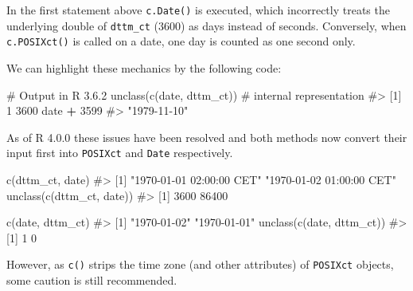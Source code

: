 \documentclass[
]{krantz}
\makeatletter
\newenvironment{Shaded}{\begin{snugshade}}{\end{snugshade}}
\newcommand{\CommentTok}[1]{\textcolor[rgb]{0.56,0.35,0.01}{\textit{#1}}}
\newcommand{\DataTypeTok}[1]{\textcolor[rgb]{0.13,0.29,0.53}{#1}}
\newcommand{\DecValTok}[1]{\textcolor[rgb]{0.00,0.00,0.81}{#1}}
\newcommand{\KeywordTok}[1]{\textcolor[rgb]{0.13,0.29,0.53}{\textbf{#1}}}
\newcommand{\NormalTok}[1]{#1}
\newcommand{\OperatorTok}[1]{\textcolor[rgb]{0.81,0.36,0.00}{\textbf{#1}}}
\newcommand{\StringTok}[1]{\textcolor[rgb]{0.31,0.60,0.02}{#1}}
\newenvironment{kframe}{%
\medskip{}
\setlength{\fboxsep}{.8em}
 \def\at@end@of@kframe{}%
 \ifinner\ifhmode%
  \def\at@end@of@kframe{\end{minipage}}%
  \begin{minipage}{\columnwidth}%
 \fi\fi%
 \def\FrameCommand##1{\hskip\@totalleftmargin \hskip-\fboxsep
 \colorbox{shadecolor}{##1}\hskip-\fboxsep
     \hskip-\linewidth \hskip-\@totalleftmargin \hskip\columnwidth}%
 \MakeFramed {\advance\hsize-\width
   \@totalleftmargin\z@ \linewidth\hsize
   \@setminipage}}%
 {\par\unskip\endMakeFramed%
 \at@end@of@kframe}
\renewenvironment{Shaded}{\begin{kframe}}{\end{kframe}}
\renewcommand{\KeywordTok} [1]{\textcolor[rgb]{0.00,0.44,0.13}{{#1}}}
\renewcommand{\DataTypeTok}[1]{\textcolor[rgb]{0.56,0.13,0.00}{{#1}}}
\renewcommand{\DecValTok}  [1]{\textcolor[rgb]{0.25,0.63,0.44}{{#1}}}
\renewcommand{\StringTok}  [1]{\textcolor[rgb]{0.25,0.44,0.63}{{#1}}}
\renewcommand{\CommentTok} [1]{\textcolor[rgb]{0.38,0.63,0.69}{{#1}}}
\renewcommand{\NormalTok}  [1]{{#1}}
\makeatother
\begin{document}
In the first statement above \texttt{c.Date()} is executed, which incorrectly treats the underlying double of \texttt{dttm\_ct} (3600) as days instead of seconds. Conversely, when \texttt{c.POSIXct()} is called on a date, one day is counted as one second only.

We can highlight these mechanics by the following code:

\begin{Shaded}
\begin{Highlighting}[]
\CommentTok{# Output in R 3.6.2}
\KeywordTok{unclass}\NormalTok{(}\KeywordTok{c}\NormalTok{(date, dttm_ct))  }\CommentTok{# internal representation}
\CommentTok{#> [1] 1 3600}
\NormalTok{date }\OperatorTok{+}\StringTok{ }\DecValTok{3599}
\CommentTok{#> "1979-11-10"}
\end{Highlighting}
\end{Shaded}

As of R 4.0.0 these issues have been resolved and both methods now convert their input first into \texttt{POSIXct} and \texttt{Date} respectively.

\begin{Shaded}
\begin{Highlighting}[]
\KeywordTok{c}\NormalTok{(dttm_ct, date)}
\CommentTok{#> [1] "1970-01-01 02:00:00 CET" "1970-01-02 01:00:00 CET"}
\KeywordTok{unclass}\NormalTok{(}\KeywordTok{c}\NormalTok{(dttm_ct, date))}
\CommentTok{#> [1]  3600 86400}

\KeywordTok{c}\NormalTok{(date, dttm_ct)}
\CommentTok{#> [1] "1970-01-02" "1970-01-01"}
\KeywordTok{unclass}\NormalTok{(}\KeywordTok{c}\NormalTok{(date, dttm_ct))}
\CommentTok{#> [1] 1 0}
\end{Highlighting}
\end{Shaded}

However, as \texttt{c()} strips the time zone (and other attributes) of \texttt{POSIXct} objects, some caution is still recommended.

\begin{Shaded}
\end{Shaded}
\end{document}
